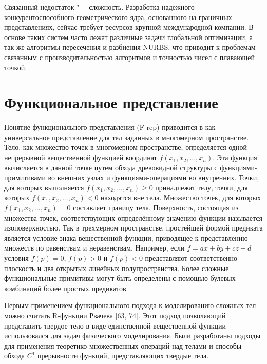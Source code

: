 {{{{{Связанный недостаток "--- сложность. Разработка надежного  конкурентоспособного геометрического ядра, основанного на граничных представлениях, сейчас требует ресурсов крупной международной компании. В основе таких систем часто лежат различные задачи глобальной оптимизации, а так же алгоритмы пересечения и разбиения NURBS, что приводит к проблемам связанным с производительностью алгоритмов и точностью чисел с плавающей точкой.

\section{Функциональное представление} \label{sect_implicit}

Понятие функционального представления (F-rep) приводится в  как универсальное представление для тел заданных в многомерном пространстве. Тело, как множество точек в многомерном пространстве, определяется одной непрерывной вещественной функцией координат $f(x_{1},x_{2},...,x_{n})$. Эта функция вычисляется в данной точке путем обхода древовидной структуры с функциями-примитивами во внешних узлах и функциями-операциями во внутренних. Точки, для которых выполняется $f(x_{1},x_{2},...,x_{n})\geq 0$ принадлежат телу, точки, для которых $ f(x_{1},x_{2},...,x_{n})<0$ находятся вне тела. Множество точек, для которых $f(x_{1},x_{2},...,x_{n})=0$ составляет границу тела. Поверхность, состоящая из множества точек, соответствующих определённому значению функции называется изоповерхностью. Так в трехмерном пространстве, простейшей формой предиката является условие знака вещественной функции, приводящее к представлению множеств по равенствам и неравенствам. Например, если $ f = ax + by + cz + d$  условия $f (p) = 0$, $f (p)> 0$ и $f (p) <0$ представляют соответственно плоскость и два открытых линейных полупространства. Более сложные функциональные примитивы могут быть определены с помощью булевых комбинаций более простых предикатов.

Первым применением функционального подхода к моделированию сложных тел можно считать R-функции Рвачева [63, 74]. Этот подход позволяющий представить твердое тело в виде единственной вещественной функции использовался для задач физического моделирования. Были разработаны подходы для применения теоретико-множественных операций над телами и способы обхода $C^1$ прерывности функций, представляющих твердые тела. 


}}}}}

